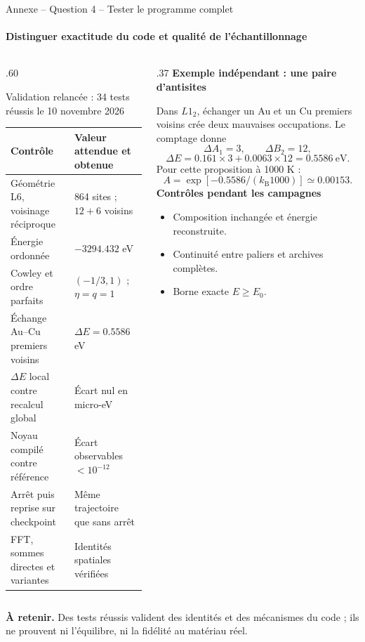 \documentclass[aspectratio=169,10pt]{beamer}
\newcommand{\kb}{k_{\mathrm B}}
\newcommand{\takeaway}[1]{\par\smallskip\colorbox{pale}{\parbox{\dimexpr\linewidth-2\fboxsep\relax}{\strut\textbf{À retenir.} #1\strut}}}
\newcommand{\tightlist}{\setlength{\itemsep}{2pt}\setlength{\parskip}{0pt}}
\begin{document}
\appendix
\begin{frame}[t]{Annexe -- Question 4 -- Tester le programme complet}
\framesubtitle{Distinguer exactitude du code et qualité de l'échantillonnage}
\begin{columns}[T,onlytextwidth]
\begin{column}{.60\textwidth}
\begin{block}{Validation relancée : 34 tests réussis le 10 novembre 2026}
\begin{tabular}{p{.47\linewidth}p{.43\linewidth}}\toprule
Contrôle & Valeur attendue et obtenue\\\midrule
Géométrie L6, voisinage réciproque & 864 sites ; $12+6$ voisins\\
Énergie ordonnée & $-3294.432$ eV\\
Cowley et ordre parfaits & $(-1/3,1)$ ; $\eta=q=1$\\
Échange Au--Cu premiers voisins & $\Delta E=0.5586$ eV\\
$\Delta E$ local contre recalcul global & Écart nul en micro-eV\\
Noyau compilé contre référence & Écart observables $<10^{-12}$\\
Arrêt puis reprise sur checkpoint & Même trajectoire que sans arrêt\\
FFT, sommes directes et variantes & Identités spatiales vérifiées\\\bottomrule
\end{tabular}
\end{block}
\end{column}
\begin{column}{.37\textwidth}
\textbf{Exemple indépendant : une paire d'antisites}

Dans $L1_2$, échanger un Au et un Cu premiers voisins crée deux mauvaises occupations.
Le comptage donne
\[
\Delta A_1=3,\qquad \Delta B_2=12,
\]
\[
\Delta E=0.161\times3+0.0063\times12
=0.5586\ \mathrm{eV}.
\]
Pour cette proposition à 1000 K :
\[
A=\exp[-0.5586/(\kb1000)]\simeq0.00153.
\]
\textbf{Contrôles pendant les campagnes}
\begin{itemize}\tightlist
\item Composition inchangée et énergie reconstruite.
\item Continuité entre paliers et archives complètes.
\item Borne exacte $E\geq E_0$.
\end{itemize}
\end{column}
\end{columns}
\takeaway{Des tests réussis valident des identités et des mécanismes du code ; ils ne prouvent ni l'équilibre, ni la fidélité au matériau réel.}
\end{frame}
\end{document}
